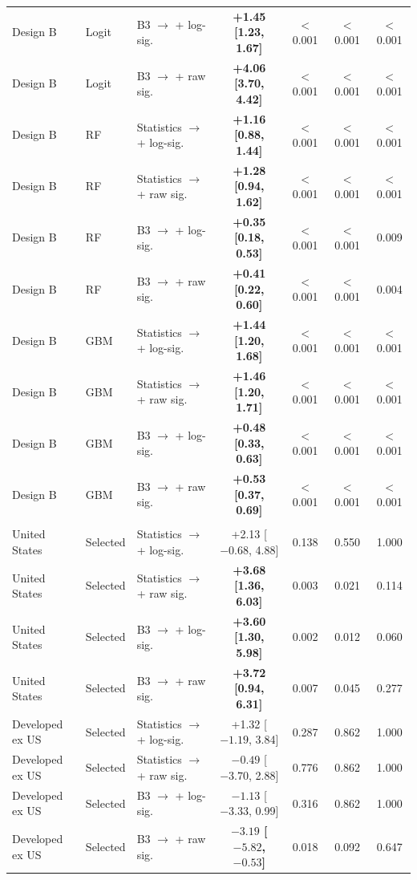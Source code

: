 \begin{tabular}{@{}lllcccc@{}}
Design B & Logit & B3 $\to$ + log-sig. & \textbf{\boldmath +1.45 [1.23, 1.67]} & $<$0.001 & $<$0.001 & $<$0.001 \\
Design B & Logit & B3 $\to$ + raw sig. & \textbf{\boldmath +4.06 [3.70, 4.42]} & $<$0.001 & $<$0.001 & $<$0.001 \\
Design B & RF & Statistics $\to$ + log-sig. & \textbf{\boldmath +1.16 [0.88, 1.44]} & $<$0.001 & $<$0.001 & $<$0.001 \\
Design B & RF & Statistics $\to$ + raw sig. & \textbf{\boldmath +1.28 [0.94, 1.62]} & $<$0.001 & $<$0.001 & $<$0.001 \\
Design B & RF & B3 $\to$ + log-sig. & \textbf{\boldmath +0.35 [0.18, 0.53]} & $<$0.001 & $<$0.001 & 0.009 \\
Design B & RF & B3 $\to$ + raw sig. & \textbf{\boldmath +0.41 [0.22, 0.60]} & $<$0.001 & $<$0.001 & 0.004 \\
Design B & GBM & Statistics $\to$ + log-sig. & \textbf{\boldmath +1.44 [1.20, 1.68]} & $<$0.001 & $<$0.001 & $<$0.001 \\
Design B & GBM & Statistics $\to$ + raw sig. & \textbf{\boldmath +1.46 [1.20, 1.71]} & $<$0.001 & $<$0.001 & $<$0.001 \\
Design B & GBM & B3 $\to$ + log-sig. & \textbf{\boldmath +0.48 [0.33, 0.63]} & $<$0.001 & $<$0.001 & $<$0.001 \\
Design B & GBM & B3 $\to$ + raw sig. & \textbf{\boldmath +0.53 [0.37, 0.69]} & $<$0.001 & $<$0.001 & $<$0.001 \\
\addlinespace
\multicolumn{7}{@{}l}{\textit{Panel B. Market forecasts, validation-selected learner (family of 8)}} \\
United States & Selected & Statistics $\to$ + log-sig. & +2.13 [$-0.68$, 4.88] & 0.138 & 0.550 & 1.000 \\
United States & Selected & Statistics $\to$ + raw sig. & \textbf{\boldmath +3.68 [1.36, 6.03]} & 0.003 & 0.021 & 0.114 \\
United States & Selected & B3 $\to$ + log-sig. & \textbf{\boldmath +3.60 [1.30, 5.98]} & 0.002 & 0.012 & 0.060 \\
United States & Selected & B3 $\to$ + raw sig. & \textbf{\boldmath +3.72 [0.94, 6.31]} & 0.007 & 0.045 & 0.277 \\
Developed ex US & Selected & Statistics $\to$ + log-sig. & +1.32 [$-1.19$, 3.84] & 0.287 & 0.862 & 1.000 \\
Developed ex US & Selected & Statistics $\to$ + raw sig. & $-0.49$ [$-3.70$, 2.88] & 0.776 & 0.862 & 1.000 \\
Developed ex US & Selected & B3 $\to$ + log-sig. & $-1.13$ [$-3.33$, 0.99] & 0.316 & 0.862 & 1.000 \\
Developed ex US & Selected & B3 $\to$ + raw sig. & \textbf{\boldmath $-3.19$ [$-5.82$, $-0.53$]} & 0.018 & 0.092 & 0.647 \\
\bottomrule
\end{tabular}

